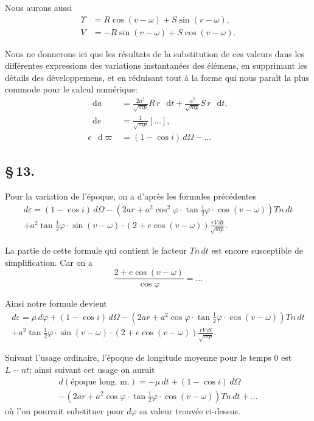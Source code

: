 \documentclass[12pt,a4paper]{article}
\newcommand{\dd}{\mathop{}\!\mathrm{d}}
\begin{document}
Nous aurons aussi
\begin{align}
\Upsilon &= R\cos(v - \omega) + S\sin(v - \omega), \tag{64} \\
V &= -R\sin(v - \omega) + S\cos(v - \omega). \tag{65}
\end{align}

Nous ne donnerons ici que les r\'{e}sultats de la substitution de ces valeurs dans les diff\'{e}rentes expressions des variations instantan\'{e}es des \'{e}l\'{e}mens, en supprimant les d\'{e}tails des d\'{e}veloppemens, et en r\'{e}duisant tout \`{a} la forme qui nous para\^{i}t la plus commode pour le calcul num\'{e}rique:
\begin{align}
\dd a &= \frac{2a^2}{\sqrt{mp}} R\,r\,\dd t + \frac{a^2}{\sqrt{mp}} S\,r\,\dd t, \tag{66} \\
\dd e &= \frac{1}{\sqrt{mp}}\left[\ldots\right], \tag{67} \\
e\,\dd\varpi &= (1 - \cos i)\,d\Omega - \ldots \tag{68}
\end{align}

\newpage
\subsection*{\S\,13.}

Pour la variation de l'\'{e}poque, on a d'apr\`{e}s les formules pr\'{e}c\'{e}dentes
\begin{multline}
d\varepsilon = (1 - \cos i)\,d\Omega - (2ar + a^2\cos^2\varphi \cdot \tan\tfrac{1}{2}\varphi \cdot \cos(v - \omega)) Tn\,dt \\
+ a^2\tan\tfrac{1}{2}\varphi \cdot \sin(v - \omega) \cdot (2 + e\cos(v - \omega)) \frac{rV\,dt}{\sqrt{mp}}. \tag{69}
\end{multline}

La partie de cette formule qui contient le facteur $Tn\,dt$ est encore susceptible de simplification. Car on a
\[
\frac{2 + e\cos(v - \omega)}{\cos\varphi} = \ldots
\]

Ainsi notre formule devient
\begin{multline}
d\varepsilon = \mu\,d\varphi + (1 - \cos i)\,d\Omega - (2ar + a^2\cos\varphi \cdot \tan\tfrac{1}{2}\varphi \cdot \cos(v - \omega)) Tn\,dt \\
+ a^2\tan\tfrac{1}{2}\varphi \cdot \sin(v - \omega) \cdot (2 + e\cos(v - \omega)) \frac{rV\,dt}{\sqrt{mp}}. \tag{70}
\end{multline}

Suivant l'usage ordinaire, l'\'{e}poque de longitude moyenne pour le temps $0$ est $L - nt$; ainsi suivant cet usage on aurait
\begin{multline}
d(\text{\'{e}poque long. m.}) = -\mu\,dt + (1 - \cos i)\,d\Omega \\
- (2ar + a^2\cos\varphi \cdot \tan\tfrac{1}{2}\varphi \cdot \cos(v - \omega)) Tn\,dt + \ldots \tag{71}
\end{multline}
o\`{u} l'on pourrait substituer pour $d\varphi$ sa valeur trouv\'{e}e ci-dessus.
\end{document}
